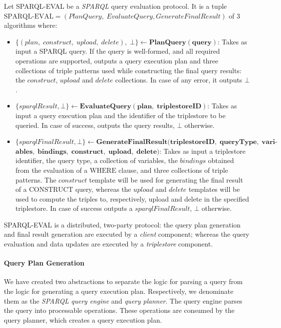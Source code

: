 \begin{definition}\label{ch3:definition:sparql-protocol}
    Let SPARQL-EVAL be a \emph{SPARQL} query evaluation protocol. It is a tuple $\textrm{SPARQL-EVAL} = (PlanQuery, \; EvaluateQuery, \allowbreak GenerateFinalResult)$ of 3 algorithms where:
    \begin{itemize}
        \item $\{(plan, \; construct, \; upload, \; delete), \; \bot\} \leftarrow \mathbf{PlanQuery(query)}$: Takes as input a \linebreak \gls{SPARQL} query. If the query is well-formed, and all required operations are supported, outputs a query execution plan and three collections of triple patterns used while constructing the final query results: the $construct$, $upload$ and $delete$ collections. In case of any error, it outputs $\bot$.

        \item $\{sparqlResult, \bot\} \leftarrow \mathbf{EvaluateQuery(plan, \; triplestoreID)}$: Takes as input a query execution plan and the identifier of the triplestore to be queried. In case of success, outputs the query results, $\bot$ otherwise.

        \item $\{sparqlFinalResult, \bot\} \leftarrow \mathbf{GenerateFinalResult(triplestoreID, \; queryType, \; vari\textrm{-}}$ \linebreak $\mathbf{ables, \; bindings, \; construct, \; upload, \; delete)}$: Takes as input a triplestore identifier, the query type, a collection of variables, the $bindings$ obtained from the evaluation of a $\textrm{WHERE}$ clause, and three collections of triple patterns. The $construct$ template will be used for generating the final result of a $\textrm{CONSTRUCT}$ query, whereas the $upload$ and $delete$ templates will be used to compute the triples to, respectively, upload and delete in the specified triplestore. In case of success outputs a $sparqlFinalResult$, $\bot$ otherwise.
    \end{itemize}
    SPARQL-EVAL is a distributed, two-party protocol: the query plan generation and final result generation are executed by a \emph{client} component; whereas the query evaluation and data updates are executed by a \emph{triplestore} component.
\end{definition}

\paragraph{Query Plan Generation} We have created two abstractions to separate the logic for parsing a query from the logic for generating a query execution plan. Respectively, we denominate them as the \emph{SPARQL} \emph{query engine} and \emph{query planner}. The query engine parses the query into processable operations. These operations are consumed by the query planner, which creates a query execution plan.

